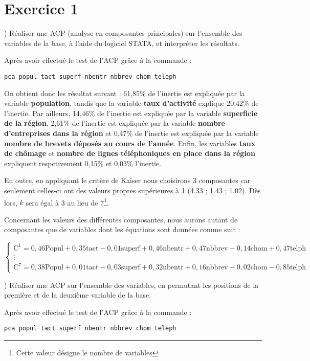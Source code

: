 \section*{Exercice 1}
) Réaliser une ACP (analyse en composantes principales) sur l’ensemble des variables de la base, à l’aide du logiciel STATA, et interpréter les résultats. 

Après avoir effectué le test de l'ACP grâce à la commande : 
\begin{lstlisting}[style=Stata]
	pca popul tact superf nbentr nbbrev chom teleph
\end{lstlisting}

On obtient donc les résultat suivant : 61,85\% de l'inertie est expliquée par la variable \textbf{population}, tandis que la variable \textbf{taux d'activité} explique 20,42\% de l'inertie. Par ailleurs, 14,46\% de l'inertie est expliquée par la variable \textbf{superficie de la région}, 2,61\% de l'inertie est expliquée par la variable \textbf{nombre d'entreprises dans la région} et 0,47\% de l'inertie est expliquée par la variable \textbf{nombre de brevets déposés au cours de l'année}. Enfin, les variables \textbf{taux de chômage} et \textbf{nombre de lignes téléphoniques en place dans la région} expliquent respctivement 0,15\% et 0,03\% l'inertie.

En outre, en appliquant le critère de Kaïser nous choisirons 3 composantes car seulement celles-ci ont des valeurs propres supérieures à 1 (4.33 ; 1.43 ; 1.02). Dès lors, $k$ sera égal à 3 au lieu de 7\footnote{Cette valeur désigne le nombre de variables}.

Concernant les valeurs des différentes composantes, nous aurons autant de composantes que de variables dont les équations sont données comme suit :

\[
\begin{cases}
	\text{C}^1 = 0,46 \text{Popul} + 0,35 \text{tact} - 0,01 \text{superf} + 0,46 \text{nbentr} + 0,47 \text{nbbrev} - 0,14 \text{chom} + 0,47 \text{telph}\\
		\vdots\\
	\text{C}^7 = 0,38 \text{Popul} + 0,01 \text{tact} - 0,03 \text{superf} + 0,32 \text{nbentr} + 0,16 \text{nbbrev} - 0,02 \text{chom} - 0,85 \text{telph}
\end{cases}
\]

) Réaliser une ACP sur l’ensemble des variables, en permutant les positions de la première et de la deuxième variable de la base.

Après avoir effectué le test de l'ACP grâce à la commande : 
\begin{lstlisting}[style=Stata]
	pca popul tact superf nbentr nbbrev chom teleph
\end{lstlisting}

